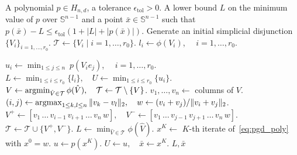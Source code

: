 \documentclass[12pt]{article}
\newcommand{\reals}{\mathbb{R}}
\newcommand{\argmin}{\mathop{\rm argmin}}
\newcommand{\cone}{\operatornamewithlimits{cone}}
\newcommand{\mcQ}{\mathcal{Q}}
\newcommand{\mcS}{\mathcal{S}}
\newcommand{\mbS}{\mathbb{S}}
\newcommand{\mcT}{\mathcal{T}}
\theoremstyle{remark}
\begin{document}
\begin{algorithm}[H]
\caption{Spatial Branch-and-Bound Algorithm for Minimizing a Form}
\label{alg:bnb}
\begin{algorithmic}
\Require A polynomial $p\in H_{n,d}$, a tolerance $\epsilon_{\text{tol}}>0$.
\Ensure A lower bound $L$ on the minimum value of $p$ over $\mbS^{n-1}$ and a point $\bar{x}\in\mbS^{n-1}$ such that 
$p(\bar{x})-L\le \epsilon_{\text{tol}}(1+|L|+|p(\bar{x})|)$.
\Initialization Generate an initial simplicial disjunction $\{V_i\}_{i=1,\ldots,r_0}$.
\State $\mcT\gets\{V_i\mid i=1,\ldots,r_0\}$. 
\State $l_i\gets \phi(V_i)$, $\quad i=1,\ldots,r_0$. 

\State $u_i\gets\min_{1\le j\le n}\ p(V_ie_j)$, $\quad i=1,\ldots,r_0$. 
\State $L\gets\min_{1\le i\le r_0}\{l_i\},\quad U\gets\min_{1\le i\le r_0}\{u_i\}$. 
\State $V\gets \argmin_{\hat{V}\in \mcT} \phi(\hat{V}),\quad \mcT\gets \mcT\setminus\{V\}$. 
\State $v_1, \ldots, v_n \gets$ columns of $V$.
\State $(i, j) \gets \operatornamewithlimits{argmax}_{1 \le k, l \le n} \|v_k-v_l\|_2,\quad w \gets (v_i + v_j)/\|v_i + v_j\|_2$.
\State $V^+ \gets [v_1\, \ldots\, v_{i-1}\, v_{i+1}\, \ldots\, v_n\, w],\quad V^- \gets [v_1\, \ldots\, v_{j-1}\, v_{j+1}\, \ldots\, v_n\, w]$. 
\State $\mcT \gets \mcT \cup \{V^+,V^-\}$.
\State $L\gets \min_{\hat{V}\in \mcT} \phi(\hat{V})$.  
\State $x^K \gets$ $K$-th iterate of~\eqref{eq:pgd_poly} with $x^0=w$.
\State $u\gets p(x^K)$.
 $U\gets u,\quad \bar{x}\gets x^K$.\EndIf
\EndFor
\EndWhile
\State \Return $L,\bar{x}$
\end{algorithmic}
\end{algorithm}
\end{document}
